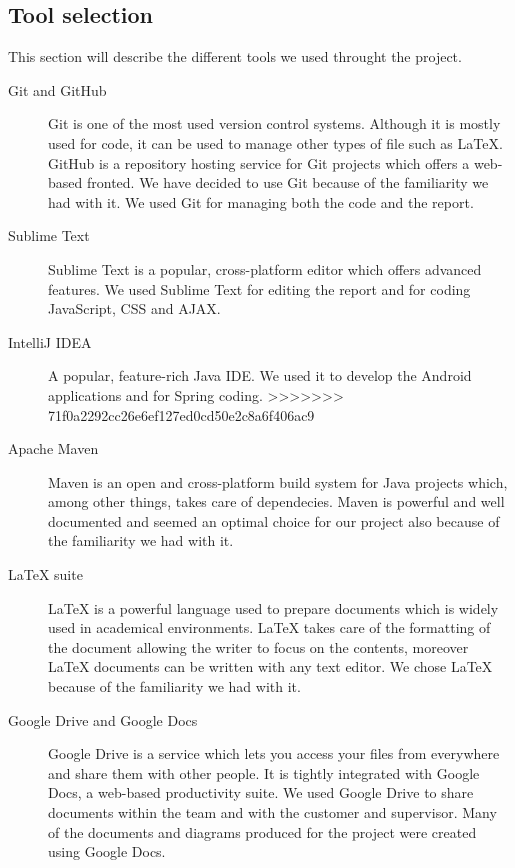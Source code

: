 \subsection{Tool selection}
This section will describe the different tools we used throught the project.


\begin{description}

\item[Git and GitHub]
Git is one of the most used version control systems. Although it is mostly used for code, it can be used to manage other types of file such as LaTeX. GitHub is a repository hosting service for Git projects which offers a web-based fronted. We have decided to use Git because of the familiarity we had with it. We used Git for managing both the code and the report.

\item[Sublime Text]
Sublime Text is a popular, cross-platform editor which offers advanced features.
We used Sublime Text for editing the report and for coding JavaScript, CSS and AJAX.

\item[IntelliJ IDEA]
A popular, feature-rich Java IDE. We used it to develop the Android applications and for Spring coding.
>>>>>>> 71f0a2292cc26e6ef127ed0cd50e2c8a6f406ac9

\item[Apache Maven]
Maven is an open and cross-platform build system for Java projects which, among other things, takes care of dependecies. Maven is powerful and well documented and seemed an optimal choice for our project also because of the familiarity we had with it.

\item[LaTeX suite]
LaTeX is a powerful language used to prepare documents which is widely used in academical environments. LaTeX takes care of the formatting of the document allowing the writer to focus on the contents, moreover LaTeX documents can be written with any text editor.
We chose LaTeX because of the familiarity we had with it.

\item[Google Drive and Google Docs]
Google Drive is a service which lets you access your files from everywhere and share them with other people. It is tightly integrated with Google Docs, a web-based productivity suite. We used Google Drive to share documents within the team and with the customer and supervisor.
Many of the documents and diagrams produced for the project were created using Google Docs.


\end{description}

